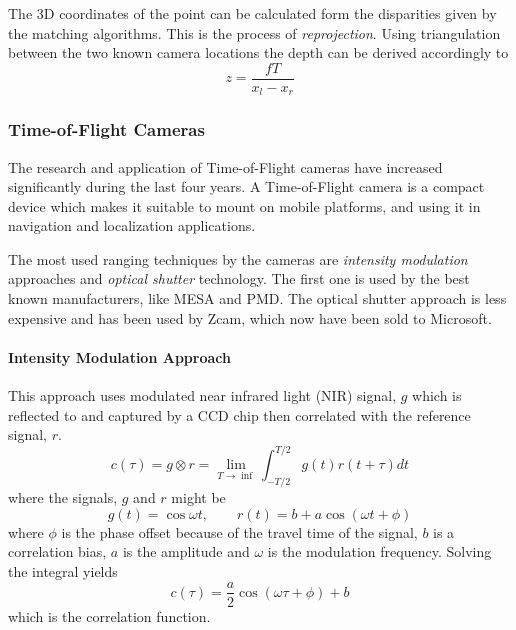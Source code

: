 The 3D coordinates of the point can be calculated form the disparities given by the
matching algorithms. This is the process of \emph{reprojection}. Using triangulation
between the two known camera locations the depth can be derived accordingly to 
\begin{equation}
    z = \frac{f T}{x_l - x_r}
\end{equation}

\subsubsection{Time-of-Flight Cameras}
The research and application of Time-of-Flight cameras have increased significantly during the last four
years. A Time-of-Flight camera is a compact device which makes it suitable to mount on
mobile platforms, and using it in navigation and localization applications. 

The most used ranging techniques by the cameras are \emph{intensity modulation} approaches and
\emph{optical shutter} technology. The first one is used by the best known manufacturers,
like MESA and PMD. The optical shutter approach is less expensive and has been used
by Zcam, which now have been sold to Microsoft. 


\paragraph{Intensity Modulation Approach}
\label{chap2:subsec-tof}
This approach uses modulated near infrared light (NIR) signal, $g$ which is reflected to and
captured by a CCD chip then correlated with the reference signal, $r$. 
\begin{equation}
    c(\tau) = g \otimes r = \lim_{T \rightarrow \inf} \int^{T/2}_{-T/2} g(t) r(t + \tau) dt
\end{equation}
where the signals, $g$ and $r$ might be
\begin{equation}
    g(t) = \cos{\omega t}, \quad \quad r(t) = b + a \cos{(\omega t + \phi)}
\end{equation}
where $\phi$ is the phase offset because of the travel time of the signal, $b$ is a
correlation bias, $a$ is the amplitude and $\omega$ is the modulation frequency. Solving
the integral yields 
\begin{equation}
    c(\tau) = \frac{a}{2} \cos{(\omega \tau + \phi )} + b
\end{equation}
which is the correlation function. 

